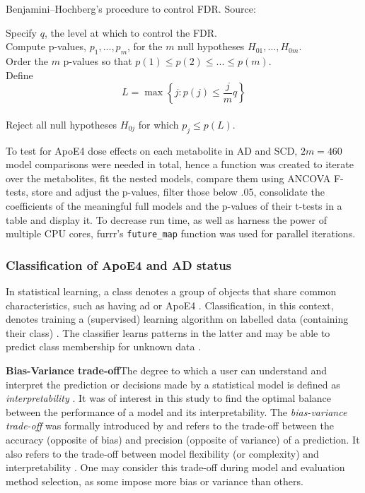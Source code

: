 \documentclass{amsart}
\begin{document}
\begin{algorithm}
\caption{Benjamini–Hochberg's procedure to control FDR. Source: \cite{James2023AnEdition}}\label{alg:fdr}
Specify $q$, the level at which to control the FDR.\\
Compute p-values, $p_1, ... , p_m$, for the $m$ null hypotheses $H_{01},...,H_{0m}$. \\
Order the $m$ p-values so that $p(1) \leq p(2) \leq ... \leq p(m)$.\\
Define
\[L = \max\left\{j : p(j) \leq \frac{j}{m}q \right\}\] \\
Reject all null hypotheses $H_{0j}$ for which $p_j \leq p(L)$.
\end{algorithm}

To test for ApoE4 dose effects on each metabolite in AD and SCD, $2m=460$ model comparisons were needed in total, hence a function was created to iterate over the metabolites, fit the nested models, compare them using ANCOVA F-tests, store and adjust the p-values, filter those below .05, consolidate the coefficients of the meaningful full models and the p-values of their t-tests in a table and display it. To decrease run time, as well as harness the power of multiple CPU cores, \textsf{furrr}'s \texttt{future\_map} function was used for parallel iterations.

\subsubsection{Classification of ApoE4 and AD status}\label{rq2}
In statistical learning, a class denotes a group of objects that share common characteristics, such as having \acrshort{ad} or ApoE4 \cite*{Drummond2010}. Classification, in this context, denotes training a (supervised) learning algorithm on labelled data (containing their class) \cite*{Drummond2010}. The classifier learns patterns in the latter and may be able to predict class membership for unknown data \cite*{Drummond2010}.

\leavevmode\newline \textbf{Bias-Variance trade-off}\hspace{.25cm}The degree to which a user can understand and interpret the prediction or decisions made by a statistical model is defined as \textit{interpretability} \cite{Elshawi2019OnHypertension}. It was of interest in this study to find the optimal balance between the performance of a model and its interpretability. The \textit{bias-variance trade-off} was formally introduced by \citeauthor{Geman1992NeuralDilemma} and refers to the trade-off between the accuracy (opposite of bias) and precision (opposite of variance) of a prediction. It also refers to the trade-off between model flexibility (or complexity) and interpretability \cite{Geman1992NeuralDilemma}. One may consider this trade-off during model and evaluation method selection, as some impose more bias or variance than others.
\end{document}

